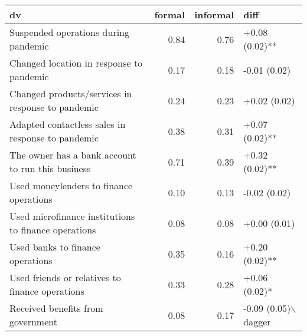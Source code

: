 \begin{table}[ht]
\centering
\begin{tabular}{lrrl}
  \hline
dv & formal & informal & diff \\ 
  \hline
Suspended operations during pandemic & 0.84 & 0.76 & +0.08 (0.02)** \\ 
  Changed location in response to pandemic & 0.17 & 0.18 & -0.01 (0.02) \\ 
  Changed  products/services in response to pandemic & 0.24 & 0.23 & +0.02 (0.02) \\ 
  Adapted contactless sales in response to pandemic & 0.38 & 0.31 & +0.07 (0.02)** \\ 
  The owner has a bank account to run this business & 0.71 & 0.39 & +0.32 (0.02)** \\ 
  Used moneylenders to finance operations & 0.10 & 0.13 & -0.02 (0.02) \\ 
  Used microfinance institutions to finance operations & 0.08 & 0.08 & +0.00 (0.01) \\ 
  Used banks to finance operations & 0.35 & 0.16 & +0.20 (0.02)** \\ 
  Used friends or relatives to finance operations & 0.33 & 0.28 & +0.06 (0.02)* \\ 
  Received benefits from government & 0.08 & 0.17 & -0.09 (0.05)$\backslash$dagger \\ 
   \hline
\end{tabular}
\end{table}
